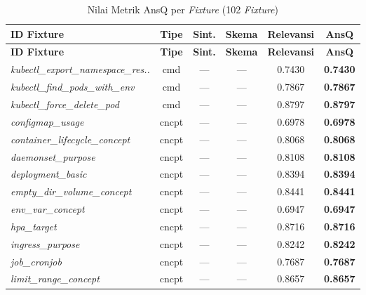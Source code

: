 \begin{footnotesize}
\begin{longtable}{|p{3.6cm}|c|c|c|c|c|}
\caption{Nilai Metrik AnsQ per \textit{Fixture} (102 \textit{Fixture})}
\label{tbl:ansq-full} \\
\hline
\textbf{ID Fixture} & \textbf{Tipe} & \textbf{Sint.} & \textbf{Skema} & \textbf{Relevansi} & \textbf{AnsQ} \\
\hline
\endfirsthead
\hline
\textbf{ID Fixture} & \textbf{Tipe} & \textbf{Sint.} & \textbf{Skema} & \textbf{Relevansi} & \textbf{AnsQ} \\
\hline
\endhead
\hline
\endfoot
\hline
\endlastfoot
\textit{kubectl\_\allowbreak{}export\_\allowbreak{}namespace\_\allowbreak{}res..} & cmd & --- & --- & 0.7430 & \textbf{0.7430} \\
\hline
\textit{kubectl\_\allowbreak{}find\_\allowbreak{}pods\_\allowbreak{}with\_\allowbreak{}env} & cmd & --- & --- & 0.7867 & \textbf{0.7867} \\
\hline
\textit{kubectl\_\allowbreak{}force\_\allowbreak{}delete\_\allowbreak{}pod} & cmd & --- & --- & 0.8797 & \textbf{0.8797} \\
\hline
\textit{configmap\_\allowbreak{}usage} & cncpt & --- & --- & 0.6978 & \textbf{0.6978} \\
\hline
\textit{container\_\allowbreak{}lifecycle\_\allowbreak{}concept} & cncpt & --- & --- & 0.8068 & \textbf{0.8068} \\
\hline
\textit{daemonset\_\allowbreak{}purpose} & cncpt & --- & --- & 0.8108 & \textbf{0.8108} \\
\hline
\textit{deployment\_\allowbreak{}basic} & cncpt & --- & --- & 0.8394 & \textbf{0.8394} \\
\hline
\textit{empty\_\allowbreak{}dir\_\allowbreak{}volume\_\allowbreak{}concept} & cncpt & --- & --- & 0.8441 & \textbf{0.8441} \\
\hline
\textit{env\_\allowbreak{}var\_\allowbreak{}concept} & cncpt & --- & --- & 0.6947 & \textbf{0.6947} \\
\hline
\textit{hpa\_\allowbreak{}target} & cncpt & --- & --- & 0.8716 & \textbf{0.8716} \\
\hline
\textit{ingress\_\allowbreak{}purpose} & cncpt & --- & --- & 0.8242 & \textbf{0.8242} \\
\hline
\textit{job\_\allowbreak{}cronjob} & cncpt & --- & --- & 0.7687 & \textbf{0.7687} \\
\hline
\textit{limit\_\allowbreak{}range\_\allowbreak{}concept} & cncpt & --- & --- & 0.8657 & \textbf{0.8657} \\

\end{longtable}
\end{footnotesize}
